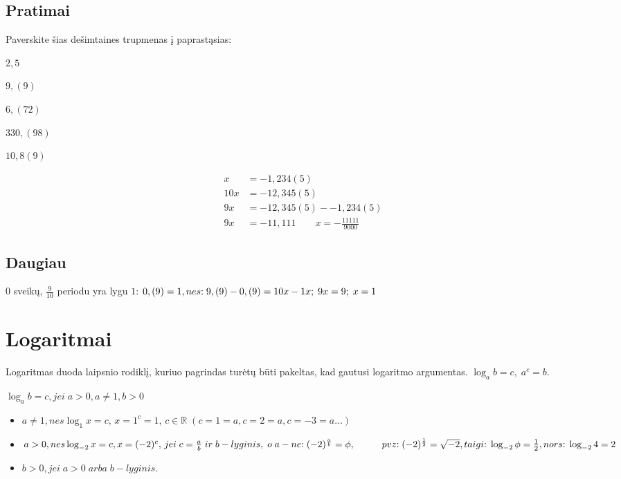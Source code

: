 \documentclass[fleqn]{article} %
\newenvironment{exercises}{\begin{enumerate*}[label=\alph*), itemjoin=\qquad]}{\end{enumerate*}}
\begin{document}
\subsection{Pratimai}

Paverskite šias dešimtaines trupmenas į paprastąsias: \\
\begin{exercises}
    \item $2,5      $
    \item $9,(9)    $
    \item $6,(72)   $
    \item $330,(98) $
    \item $10,8(9)  $ 
\end{exercises} 

\begin{align*}
    x   &= -1,234(5)              \\
    10x &= -12,345(5)             \\
    9x  &= -12,345(5) - -1,234(5) \\
    9x  &= -11,111  \qquad  x = -\frac{11111}{9000}
\end{align*}  

\subsection{Daugiau}
$0$ sveikų, $\frac{9}{10}$ periodu yra lygu $1$:
\begin{math}\\
    0,(9) = 1, nes{:}\; 9,(9) - 0,(9) = 10x - 1x;\; 9x = 9;\; x = 1
\end{math}


\section{Logaritmai}

Logaritmas duoda laipsnio rodiklį, kuriuo pagrindas turėtų būti pakeltas, kad gautusi logaritmo argumentas.
$\log_a b = c,\;a^c = b$.

\begin{math}
    \log_a b = c, jei\; a > 0, a \ne 1, b > 0
\end{math}

\begin{itemize}
    \item $a \ne 1, nes \log_1 x = c,\,x = 1^c = 1,\, c \in \mathbb{R}\; 
    (c = 1 = a, c = 2 = a, c = -3 = a \dots)$
    \item $a > 0, nes \log_{-2} x = c, x = (-2)^c,\,jei\;c = \frac{a}{b}\;ir\;b - lyginis,\;o\;a - ne{:}\; (-2)^\frac{a}{b} = \phi,\\ \hspace*{10mm} pvz{:}\; (-2)^\frac{1}{2} = \sqrt{-2}, taigi{:}\;\log_{-2} \phi = \frac{1}{2}, nors{:}\; \log_{-2} 4 = 2$
    \item $b > 0, jei\;a > 0\;arba\;b - lyginis.$
\end{itemize}
\end{document}
